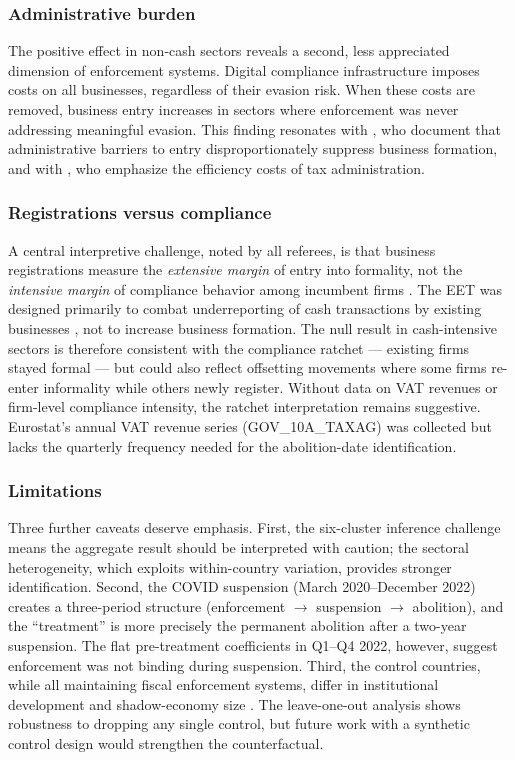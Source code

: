 \documentclass[12pt]{article}
\begin{document}
\subsubsection*{Administrative burden} The positive effect in non-cash sectors reveals a second, less appreciated dimension of enforcement systems. Digital compliance infrastructure imposes costs on all businesses, regardless of their evasion risk. When these costs are removed, business entry increases in sectors where enforcement was never addressing meaningful evasion. This finding resonates with \citet{djankov2010effect}, who document that administrative barriers to entry disproportionately suppress business formation, and with \citet{slemrod2006optimal}, who emphasize the efficiency costs of tax administration.

\subsubsection*{Registrations versus compliance} A central interpretive challenge, noted by all referees, is that business registrations measure the \textit{extensive margin} of entry into formality, not the \textit{intensive margin} of compliance behavior among incumbent firms \citep{ulyssea2018firms}. The EET was designed primarily to combat underreporting of cash transactions by existing businesses \citep{allingham1972income, slemrod2019tax}, not to increase business formation. The null result in cash-intensive sectors is therefore consistent with the compliance ratchet --- existing firms stayed formal --- but could also reflect offsetting movements where some firms re-enter informality while others newly register. Without data on VAT revenues or firm-level compliance intensity, the ratchet interpretation remains suggestive. Eurostat's annual VAT revenue series (GOV\_10A\_TAXAG) was collected but lacks the quarterly frequency needed for the abolition-date identification.

\subsubsection*{Limitations} Three further caveats deserve emphasis. First, the six-cluster inference challenge means the aggregate result should be interpreted with caution; the sectoral heterogeneity, which exploits within-country variation, provides stronger identification. Second, the COVID suspension (March 2020--December 2022) creates a three-period structure (enforcement $\to$ suspension $\to$ abolition), and the ``treatment'' is more precisely the permanent abolition after a two-year suspension. The flat pre-treatment coefficients in Q1--Q4 2022, however, suggest enforcement was not binding during suspension. Third, the control countries, while all maintaining fiscal enforcement systems, differ in institutional development and shadow-economy size \citep{besley2014drives, bachas2023tax}. The leave-one-out analysis shows robustness to dropping any single control, but future work with a synthetic control design would strengthen the counterfactual.
\end{document}
